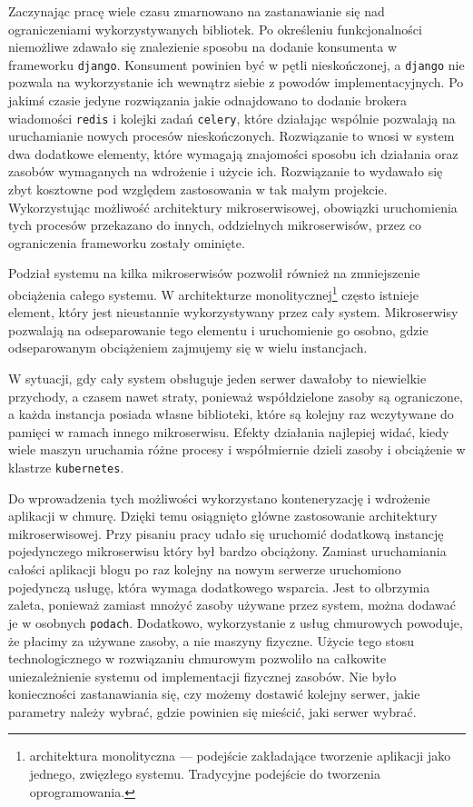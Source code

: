 \documentclass[12pt,twoside]{article}
\begin{document}
Zaczynając pracę wiele czasu zmarnowano na zastanawianie się nad ograniczeniami wykorzystywanych bibliotek. Po określeniu funkcjonalności niemożliwe zdawało się znalezienie sposobu na dodanie konsumenta w frameworku \texttt{django}. Konsument powinien być w pętli nieskończonej, a \texttt{django} nie pozwala na wykorzystanie ich wewnątrz siebie z powodów implementacyjnych. Po jakimś czasie jedyne rozwiązania jakie odnajdowano to dodanie brokera wiadomości \texttt{redis} i kolejki zadań \texttt{celery}, które działając wspólnie pozwalają na uruchamianie nowych procesów nieskończonych. Rozwiązanie to wnosi w system dwa dodatkowe elementy, które wymagają znajomości sposobu ich działania oraz zasobów wymaganych na wdrożenie i użycie ich. Rozwiązanie to wydawało się zbyt kosztowne pod względem zastosowania w tak małym projekcie. Wykorzystując możliwość architektury mikroserwisowej, obowiązki uruchomienia tych procesów przekazano do innych, oddzielnych mikroserwisów, przez co ograniczenia frameworku zostały ominięte.

Podział systemu na kilka mikroserwisów pozwolił również na zmniejszenie obciążenia całego systemu. W architekturze monolitycznej\footnote{architektura monolityczna — podejście zakładające tworzenie aplikacji jako jednego, zwięzłego systemu. Tradycyjne podejście do tworzenia oprogramowania.} często istnieje element, który jest nieustannie wykorzystywany przez cały system. Mikroserwisy pozwalają na odseparowanie tego elementu i uruchomienie go osobno, gdzie odseparowanym obciążeniem zajmujemy się w wielu instancjach. 

W sytuacji, gdy cały system obsługuje jeden serwer dawałoby to niewielkie przychody, a czasem nawet straty, ponieważ współdzielone zasoby są ograniczone, a każda instancja posiada własne biblioteki, które są kolejny raz wczytywane do pamięci w ramach innego mikroserwisu. Efekty działania najlepiej widać, kiedy wiele maszyn uruchamia różne procesy i współmiernie dzieli zasoby i obciążenie w klastrze \texttt{kubernetes}.

Do wprowadzenia tych możliwości wykorzystano konteneryzację i wdrożenie aplikacji w chmurę. Dzięki temu osiągnięto główne zastosowanie architektury mikroserwisowej. Przy pisaniu pracy udało się uruchomić dodatkową instancję pojedynczego mikroserwisu który był bardzo obciążony. Zamiast uruchamiania całości aplikacji blogu po raz kolejny na nowym serwerze uruchomiono pojedynczą usługę, która wymaga dodatkowego wsparcia. Jest to olbrzymia zaleta, ponieważ zamiast mnożyć zasoby używane przez system, można dodawać je w osobnych \texttt{podach}. Dodatkowo, wykorzystanie z usług chmurowych powoduje, że płacimy za używane zasoby, a nie maszyny fizyczne. Użycie tego stosu technologicznego w rozwiązaniu chmurowym pozwoliło na całkowite uniezależnienie systemu od implementacji fizycznej zasobów. Nie było konieczności zastanawiania się, czy możemy dostawić kolejny serwer, jakie parametry należy wybrać, gdzie powinien się mieścić, jaki serwer wybrać.
 
\end{document}
